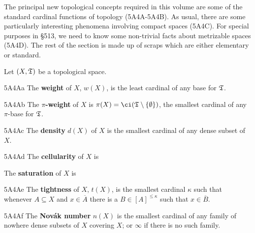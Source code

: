 
\def\chaptername{Appendix}
\def\sectionname{General topology}

\def\Engelking{{\smc Engelking 89}}


The principal new topological concepts required in this volume are
some of the standard cardinal functions of topology (5A4A-5A4B).
As usual, there are some particularly interesting phenomena involving
compact spaces (5A4C).   For special purposes in \S513, we need to
know some non-trivial facts about metrizable spaces (5A4D).
The rest of the section is made up of scraps which are either elementary or
standard.

 Let $(X,\frak T)$ be a topological space.

\spheader 5A4Aa The {\bf weight} of $X$, $w(X)$, is the least cardinal
of any base for $\frak T$.

\spheader 5A4Ab The {\bf $\pi$-weight} of $X$ is
$\pi(X)=\ci(\frak T\setminus\{\emptyset\})$, the smallest cardinal of any
$\pi$-base for $\frak T$.

\spheader 5A4Ac The {\bf density} $d(X)$ of
$X$ is the smallest cardinal of any dense subset of $X$.

\spheader 5A4Ad The {\bf cellularity} of $X$ is


\noindent The {\bf saturation} of $X$ is



\spheader 5A4Ae The {\bf tightness} of $X$, $t(X)$, is the smallest
cardinal $\kappa$ such that whenever $A\subseteq X$ and
$x\in\overline{A}$ there is a $B\in[A]^{\le\kappa}$ such that
$x\in\overline{B}$.   

\spheader 5A4Af The {\bf Nov\'ak number}
$n(X)$ is the smallest cardinal of any family of nowhere dense subsets
of $X$ covering $X$;  or $\infty$ if there is no such family.

